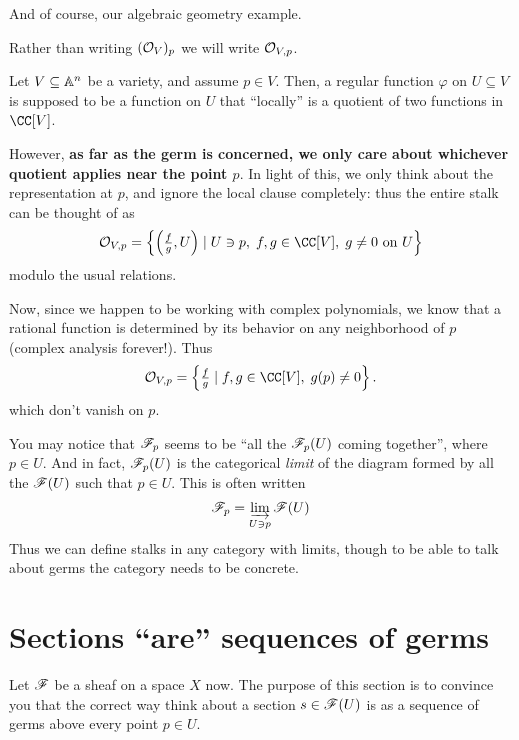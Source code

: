 \documentclass[11pt]{scrreprt}
\begin{document}
And of course, our algebraic geometry example.
\begin{abuse}
	Rather than writing $(\mathcal O_V)_p$ we will write $\mathcal O_{V,p}$.
\end{abuse}
\begin{example}
	Let $V \subseteq \mathbb A^n$ be a variety, and assume $p \in V$.
	Then, a regular function $\varphi$ on $U \subseteq V$
	is supposed to be a function on $U$ that ``locally'' is a quotient
	of two functions in $\CC[V]$.

	However, \textbf{as far as the germ is concerned, we only care about
	whichever quotient applies near the point $p$}.
	In light of this, we only think about the representation at $p$,
	and ignore the local clause completely:
	thus the entire stalk can be thought of as
	\[
		\OO_{V,p} = 
		\left\{ \left( \tfrac fg , U \right) \mid 
			U \ni p, \; f,g \in \CC[V], \;
			\text{$g \neq 0$ on $U$} \right\}
	\]
	modulo the usual relations.

	Now, since we happen to be working with complex polynomials,
	we know that a rational function is determined by its
	behavior on any neighborhood of $p$
	(complex analysis forever!).
	Thus 
	\[
		\OO_{V,p} =
		\left\{ \tfrac fg \mid f,g \in \CC[V], \; g(p) \neq 0 \right\}.
	\]
	which don't vanish on $p$.
\end{example}

\begin{remark}
	You may notice that $\mathscr F_p$ seems to be
	``all the $\mathscr F_p(U)$ coming together'', where $p \in U$.
	And in fact, $\mathscr F_p(U)$ is the categorical \emph{limit}
	of the diagram formed by all the $\mathscr F(U)$ such that $p \in U$.
	This is often written
	\[ \mathscr F_p = \varinjlim_{U \ni p} \mathscr F(U) \]
	Thus we can define stalks in any category with limits,
	though to be able to talk about germs the category needs
	to be concrete.
\end{remark}

\section{Sections ``are'' sequences of germs}
Let $\mathscr F$ be a sheaf on a space $X$ now.
The purpose of this section is to convince you that the correct way 
think about a section $s \in \mathscr F(U)$ is as a sequence of germs
above every point $p \in U$.
\end{document}
